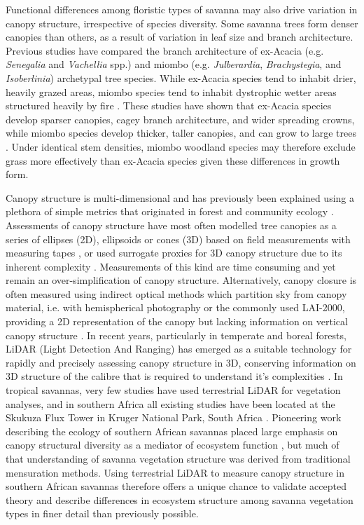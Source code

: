 \documentclass[11pt,a4paper]{article}
\begin{document}
Functional differences among floristic types of savanna may also drive variation in canopy structure, irrespective of species diversity. Some savanna trees form denser canopies than others, as a result of variation in leaf size and branch architecture. Previous studies have compared the branch architecture of ex-Acacia (e.g. \textit{Senegalia} and \textit{Vachellia} spp.) and miombo (e.g. \textit{Julberardia}, \textit{Brachystegia}, and \textit{Isoberlinia}) archetypal tree species. While ex-Acacia species tend to inhabit drier, heavily grazed areas, miombo species tend to inhabit dystrophic wetter areas structured heavily by fire \citep{Ribeiro2020}. These studies have shown that ex-Acacia species develop sparser canopies, cagey branch architecture, and wider spreading crowns, while miombo species develop thicker, taller canopies, and can grow to large trees \citep{Mugasha2013, Archibald2003, Privette2004}. Under identical stem densities, miombo woodland species may therefore exclude grass more effectively than ex-Acacia species given these differences in growth form. 

Canopy structure is multi-dimensional and has previously been explained using a plethora of simple metrics that originated in forest and community ecology \citep{Kershaw2017}. Assessments of canopy structure have most often modelled tree canopies as a series of ellipses (2D), ellipsoids or cones (3D) based on field measurements with measuring tapes \citep{Jucker2015}, or used surrogate proxies for 3D canopy structure due to its inherent complexity \citep{Seidel2011}. Measurements of this kind are time consuming and yet remain an over-simplification of canopy structure. Alternatively, canopy closure is often measured using indirect optical methods which partition sky from canopy material, i.e. with hemispherical photography or the commonly used LAI-2000, providing a 2D representation of the canopy but lacking information on vertical canopy structure \citep{Jonckheere2004}. In recent years, particularly in temperate and boreal forests, LiDAR (Light Detection And Ranging) has emerged as a suitable technology for rapidly and precisely assessing canopy structure in 3D, conserving information on 3D structure of the calibre that is required to understand it's complexities \citep{Muir2018, Calders2020}. In tropical savannas, very few studies have used terrestrial LiDAR for vegetation analyses, and in southern Africa all existing studies have been located at the Skukuza Flux Tower in Kruger National Park, South Africa \citep{Muumbe2021}. Pioneering work describing the ecology of southern African savannas placed large emphasis on canopy structural diversity as a mediator of ecosystem function \citep{Solbrig1996}, but much of that understanding of savanna vegetation structure was derived from traditional mensuration methods. Using terrestrial LiDAR to measure canopy structure in southern African savannas therefore offers a unique chance to validate accepted theory and describe differences in ecosystem structure among savanna vegetation types in finer detail than previously possible.
\end{document}
